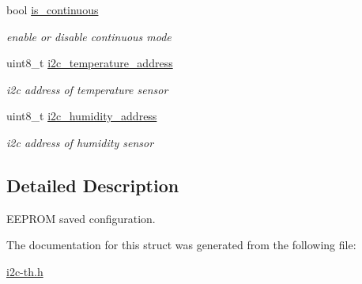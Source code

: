 \begin{DoxyCompactItemize}
\mbox{\label{structconfiguration__t_a33f99299576a58b3eb55be371e143531}} 
bool \hyperlink{structconfiguration__t_a33f99299576a58b3eb55be371e143531}{is\+\_\+continuous}
\begin{DoxyCompactList}\small\item\em enable or disable continuous mode \end{DoxyCompactList}\item 
\mbox{\label{structconfiguration__t_aed0a51c0dfbd925368c8539cf10c3001}} 
uint8\+\_\+t \hyperlink{structconfiguration__t_aed0a51c0dfbd925368c8539cf10c3001}{i2c\+\_\+temperature\+\_\+address}
\begin{DoxyCompactList}\small\item\em i2c address of temperature sensor \end{DoxyCompactList}\item 
\mbox{\label{structconfiguration__t_a79d1b1d9cb095c2bc0deb36c4f44452c}} 
uint8\+\_\+t \hyperlink{structconfiguration__t_a79d1b1d9cb095c2bc0deb36c4f44452c}{i2c\+\_\+humidity\+\_\+address}
\begin{DoxyCompactList}\small\item\em i2c address of humidity sensor \end{DoxyCompactList}\end{DoxyCompactItemize}


\subsection{Detailed Description}
E\+E\+P\+R\+OM saved configuration. 

The documentation for this struct was generated from the following file\+:\begin{DoxyCompactItemize}
\item 
\hyperlink{i2c-th_8h}{i2c-\/th.\+h}\end{DoxyCompactItemize}

